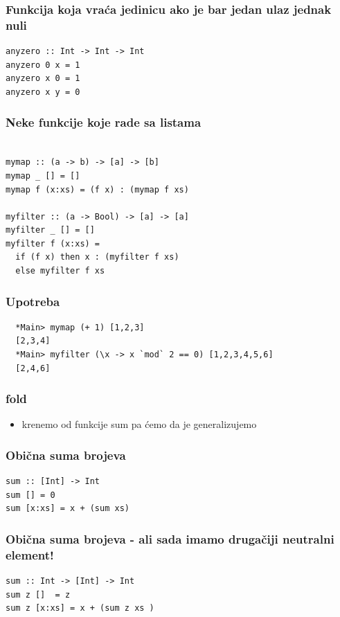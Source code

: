 \documentclass{beamer}
\begin{document}
\begin{frame}[fragile]
  \frametitle{Funkcija koja vraća jedinicu ako je bar jedan ulaz jednak nuli}
  \begin{lstlisting}
anyzero :: Int -> Int -> Int
anyzero 0 x = 1
anyzero x 0 = 1
anyzero x y = 0
  \end{lstlisting}
\end{frame}


\begin{frame}[fragile]
  \frametitle{Neke funkcije koje rade sa listama}
  \begin{lstlisting}

mymap :: (a -> b) -> [a] -> [b]
mymap _ [] = []
mymap f (x:xs) = (f x) : (mymap f xs)

myfilter :: (a -> Bool) -> [a] -> [a]
myfilter _ [] = [] 
myfilter f (x:xs) = 
  if (f x) then x : (myfilter f xs) 
  else myfilter f xs

  \end{lstlisting}
\end{frame}

\begin{frame}[fragile]
  \frametitle{Upotreba}
  \begin{lstlisting}
  *Main> mymap (+ 1) [1,2,3]
  [2,3,4]
  *Main> myfilter (\x -> x `mod` 2 == 0) [1,2,3,4,5,6]
  [2,4,6]

  \end{lstlisting}
\end{frame}
    

\begin{frame}
  \frametitle{fold}
  \begin{itemize}
    \item krenemo od funkcije sum pa ćemo da je generalizujemo
  \end{itemize}
\end{frame}

\begin{frame}[fragile]
  \frametitle{Obična suma brojeva}
  \begin{lstlisting}
sum :: [Int] -> Int
sum [] = 0
sum [x:xs] = x + (sum xs)
  \end{lstlisting}
\end{frame}


\begin{frame}[fragile]
  \frametitle{Obična suma brojeva - ali sada imamo drugačiji neutralni element!}
  \begin{lstlisting}
sum :: Int -> [Int] -> Int
sum z []  = z
sum z [x:xs] = x + (sum z xs )
  \end{lstlisting}
\end{frame}
\end{document}
